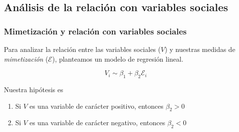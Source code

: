 \subsection{Análisis de la relación con variables sociales}

\begin{frame}
\frametitle{Mimetización y relación con variables sociales}

  Para analizar la relación entre las variables sociales ($V$) y nuestras medidas de \emph{mimetización} ($\mathcal{E}$), planteamos un modelo de regresión lineal.

    \begin{equation}
      V_i \sim \beta_1 + \beta_2 \mathcal{E}_i
    \end{equation}

  Nuestra hipótesis es

  \begin{enumerate}
    \item Si $V$ es una variable de carácter positivo, entonces $\beta_2 > 0$
    \item Si $V$ es una variable de carácter negativo, entonces $\beta_2 < 0$
  \end{enumerate}
\end{frame}
